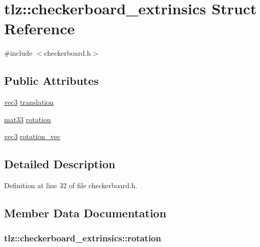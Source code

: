 \hypertarget{structtlz_1_1checkerboard__extrinsics}{}\section{tlz\+:\+:checkerboard\+\_\+extrinsics Struct Reference}
\label{structtlz_1_1checkerboard__extrinsics}


{\ttfamily \#include $<$checkerboard.\+h$>$}

\subsection*{Public Attributes}
\begin{DoxyCompactItemize}
\item 
\hyperlink{namespacetlz_ad0646d752ddb9d40d702d40cc6dc54a1}{vec3} \hyperlink{structtlz_1_1checkerboard__extrinsics_acd8a8a641bef6a88474b62348d8afb91}{translation}
\item 
\hyperlink{namespacetlz_a6679497d5121f319147594e1f344ef57}{mat33} \hyperlink{structtlz_1_1checkerboard__extrinsics_a8c90b51eb43b93f69cd5a8cffbe9f064}{rotation}
\item 
\hyperlink{namespacetlz_ad0646d752ddb9d40d702d40cc6dc54a1}{vec3} \hyperlink{structtlz_1_1checkerboard__extrinsics_a690e1d1996a72bb51764cce791dfef21}{rotation\+\_\+vec}
\end{DoxyCompactItemize}


\subsection{Detailed Description}


Definition at line 32 of file checkerboard.\+h.



\subsection{Member Data Documentation}
\subsubsection[{\texorpdfstring{rotation}{rotation}}]{ tlz\+::checkerboard\+\_\+extrinsics\+::rotation}\hypertarget{structtlz_1_1checkerboard__extrinsics_a8c90b51eb43b93f69cd5a8cffbe9f064}{}\label{structtlz_1_1checkerboard__extrinsics_a8c90b51eb43b93f69cd5a8cffbe9f064}



